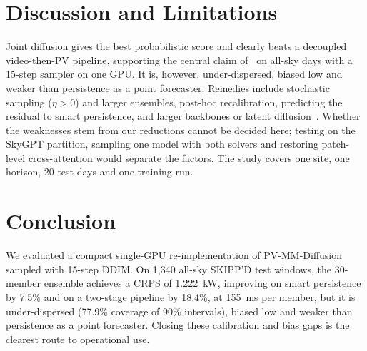 \documentclass[conference]{IEEEtran}
\begin{document}
\section{Discussion and Limitations}
\label{sec:disc}
Joint diffusion gives the best probabilistic score and clearly beats a decoupled video-then-PV pipeline, supporting
the central claim of~\cite{huang2026pvmm} on all-sky days with a 15-step sampler on one GPU. It is, however,
under-dispersed, biased low and weaker than persistence as a point forecaster. Remedies include stochastic sampling
($\eta>0$) and larger ensembles, post-hoc recalibration, predicting the residual to smart persistence, and larger
backbones or latent diffusion~\cite{gao2023prediff}. Whether the weaknesses stem from our reductions cannot be
decided here; testing on the SkyGPT partition, sampling one model with both solvers and restoring patch-level
cross-attention would separate the factors. The study covers one site, one horizon, 20 test days and one training run.

\section{Conclusion}
We evaluated a compact single-GPU re-implementation of PV-MM-Diffusion sampled with 15-step DDIM. On 1{,}340 all-sky
SKIPP'D test windows, the 30-member ensemble achieves a CRPS of \SI{1.222}{kW}, improving on smart persistence by
7.5\% and on a two-stage pipeline by 18.4\%, at \SI{155}{ms} per member, but it is under-dispersed (77.9\% coverage
of 90\% intervals), biased low and weaker than persistence as a point forecaster. Closing these calibration and bias
gaps is the clearest route to operational use.



\end{document}
